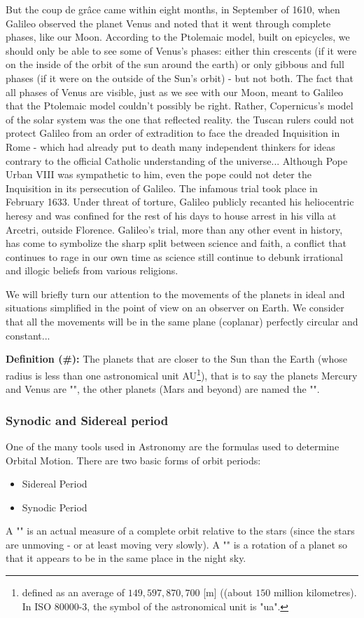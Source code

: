 	But the coup de grâce came within eight months, in September of 1610, when Galileo observed the planet Venus and noted that it went through complete phases, like our Moon. According to the Ptolemaic model, built on epicycles, we should only be able to see some of Venus’s phases: either thin crescents (if it were on the inside of the orbit of the sun around the earth) or only gibbous and full phases (if it were on the outside of the Sun’s orbit) - but not both. The fact that all phases of Venus are visible, just as we see with our Moon, meant to Galileo that the Ptolemaic model couldn't possibly be right. Rather, Copernicus’s model of the solar system was the one that reflected reality. the Tuscan rulers could not protect Galileo from an order of extradition to face the dreaded Inquisition in Rome - which had already put to death many independent thinkers for ideas contrary to the official Catholic understanding of the universe... Although Pope Urban VIII was sympathetic to him, even the pope could not deter the Inquisition in its persecution of Galileo. The infamous trial took place in February 1633. Under threat of torture, Galileo publicly recanted his heliocentric heresy and was confined for the rest of his days to house arrest in his villa at Arcetri, outside Florence. Galileo’s trial, more than any other event in history, has come to symbolize the sharp split between science and faith, a conflict that continues to rage in our own time as science still continue to debunk irrational and illogic beliefs from various religions.

	We will briefly turn our attention to the movements of the planets in ideal and situations simplified in the point of view on an observer on Earth. We consider that all the movements will be in the same plane (coplanar) perfectly circular and constant...

	\textbf{Definition (\#\mydef):} The planets that are closer to the Sun than the Earth (whose radius is less than one astronomical unit AU\footnote{defined as an average of $149,597,870,700$ [m] ((about $150$ million kilometres). In ISO 80000-3, the symbol of the astronomical unit is "ua".}), that is to say the planets Mercury and Venus are "", the other planets (Mars and beyond) are named the "".
	
	\subsubsection{Synodic and Sidereal period}
	One of the many tools used in Astronomy are the formulas used to determine Orbital Motion. There are two basic forms of orbit periods:
	\begin{itemize}
		\item Sidereal Period
		\item Synodic Period
	\end{itemize}
	A "" is an actual measure of a complete orbit relative to the stars (since the stars are unmoving - or at least moving very slowly). A "" is a rotation of a planet so that it appears to be in the same place in the night sky.
	
